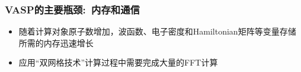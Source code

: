 \frame
{
	\frametitle{\textrm{VASP}的主要瓶颈:~内存和通信}
\begin{itemize}
	\item 随着计算对象原子数增加，波函数、电子密度和\textrm{Hamiltonian}矩阵等变量存储所需的内存迅速增长
	\item 应用``双网格技术''计算过程中需要完成大量的\textrm{FFT}计算\\
		{\fontsize{7.2pt}{5.2pt}}
\end{itemize}
\begin{figure}[h!]
	\vspace{-0.05in}
\centering
\begin{minipage}[t]{0.49\textwidth}
	

\end{minipage}
\end{figure}}
